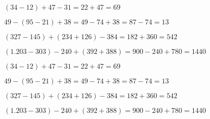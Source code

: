 \begin{rlist}
\item $ (34-12)+47-31=22+47=69 $
\item $ 49-(95-21)+38=49-74+38=87-74=13 $
\item $ (327-145)+(234+126)-384=182+360=542 $
\item $ (1.203-303)-240+(392+388)=900-240+780=1440 $
\end{rlist}
\begin{rlist}
\item $ (34-12)+47-31=22+47=69 $
\item $ 49-(95-21)+38=49-74+38=87-74=13 $
\item $ (327-145)+(234+126)-384=182+360=542 $
\item $ (1.203-303)-240+(392+388)=900-240+780=1440 $
\end{rlist}
